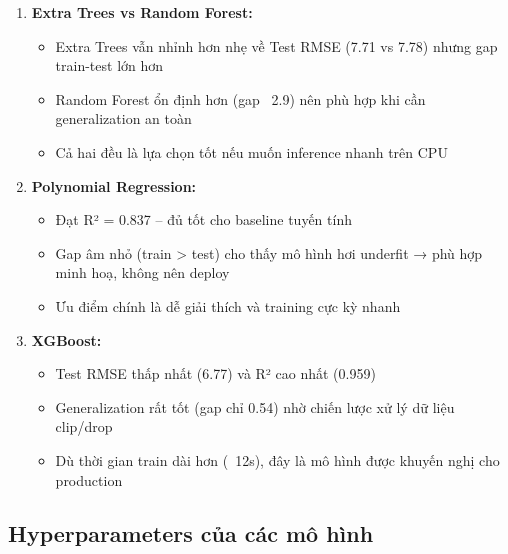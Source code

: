 \documentclass[12pt,a4paper]{article}
\begin{document}
\begin{enumerate}
    \item \textbf{Extra Trees vs Random Forest:} 
    \begin{itemize}
        \item Extra Trees vẫn nhỉnh hơn nhẹ về Test RMSE (7.71 vs 7.78) nhưng gap train-test lớn hơn
        \item Random Forest ổn định hơn (gap ~2.9) nên phù hợp khi cần generalization an toàn
        \item Cả hai đều là lựa chọn tốt nếu muốn inference nhanh trên CPU
    \end{itemize}
    
    \item \textbf{Polynomial Regression:} 
    \begin{itemize}
        \item Đạt R² = 0.837 – đủ tốt cho baseline tuyến tính
        \item Gap âm nhỏ (train > test) cho thấy mô hình hơi underfit → phù hợp minh hoạ, không nên deploy
        \item Ưu điểm chính là dễ giải thích và training cực kỳ nhanh
    \end{itemize}
    
    \item \textbf{XGBoost:}
    \begin{itemize}
        \item Test RMSE thấp nhất (6.77) và R² cao nhất (0.959)
        \item Generalization rất tốt (gap chỉ 0.54) nhờ chiến lược xử lý dữ liệu clip/drop
        \item Dù thời gian train dài hơn (~12s), đây là mô hình được khuyến nghị cho production
    \end{itemize}
\end{enumerate}

\subsection{Hyperparameters của các mô hình}
\end{document}
